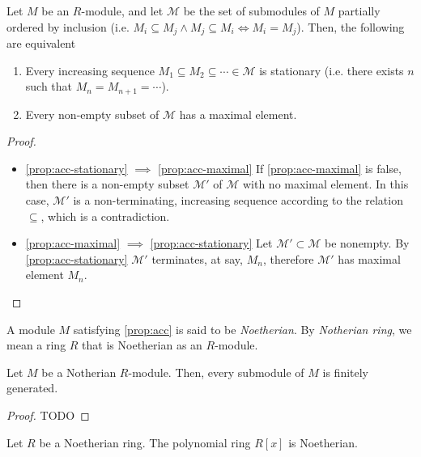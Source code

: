 
\begin{proposition}
  \label{prop:acc}
  Let $M$ be an $R$-module, and let $\mathcal{M}$ be the set of submodules of $M$ partially ordered by inclusion (i.e. $M_i \subseteq M_j \land M_j \subseteq M_i \iff M_i = M_j$). Then, the following are equivalent
  \begin{enumerate}[i]
  \item \label{prop:acc-stationary} Every increasing sequence $M_1 \subseteq M_2 \subseteq \cdots \in \mathcal{M}$ is stationary (i.e. there exists $n$ such that $M_n = M_{n + 1} = \cdots$).
  \item \label{prop:acc-maximal} Every non-empty subset of $\mathcal{M}$ has a maximal element.
  \end{enumerate}
\end{proposition}

\begin{proof}
  \begin{itemize}
  \item \cref{prop:acc-stationary} $\implies$ \cref{prop:acc-maximal}
    If \cref{prop:acc-maximal} is false, then there is a non-empty subset $\mathcal{M'}$ of $\mathcal{M}$ with no maximal element. In this case, $\mathcal{M'}$ is a non-terminating, increasing sequence according to the relation $\subseteq$, which is a contradiction.
  \item \cref{prop:acc-maximal} $\implies$ \cref{prop:acc-stationary}
    Let $\mathcal{M'} \subset \mathcal{M}$ be nonempty. By \cref{prop:acc-stationary} $\mathcal{M'}$ terminates, at say, $M_n$, therefore $\mathcal{M'}$ has maximal element $M_n$.
  \end{itemize}
\end{proof}

A module $M$ satisfying \cref{prop:acc} is said to be \emph{Noetherian}. By \emph{Notherian ring}, we mean a ring $R$ that is Noetherian as an $R$-module.

\begin{proposition}
  Let $M$ be a Notherian $R$-module. Then, every submodule of $M$ is finitely generated.
\end{proposition}

\begin{proof}
  TODO
\end{proof}

\begin{theorem}
  \label{thm:hilbert-basis}
  Let $R$ be a Noetherian ring. The polynomial ring $R[x]$ is Noetherian.
\end{theorem}

